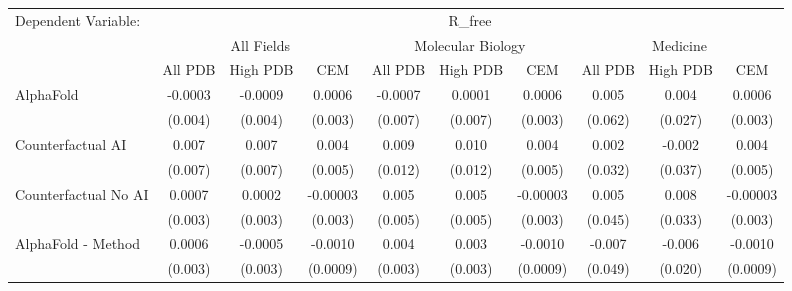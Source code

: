 \begingroup
\centering
\begin{tabular}{lccccccccc}
   \tabularnewline \midrule \midrule
   Dependent Variable: & \multicolumn{9}{c}{R\_free}\\
 & \multicolumn{3}{c}{All Fields} & \multicolumn{3}{c}{Molecular Biology} & \multicolumn{3}{c}{Medicine} \\
\cmidrule(lr){2-7} \cmidrule(lr){5-10} \cmidrule(lr){8-7}
 & \multicolumn{1}{c}{All PDB} & \multicolumn{1}{c}{High PDB} & \multicolumn{1}{c}{CEM} & \multicolumn{1}{c}{All PDB} & \multicolumn{1}{c}{High PDB} & \multicolumn{1}{c}{CEM} & \multicolumn{1}{c}{All PDB} & \multicolumn{1}{c}{High PDB} & \multicolumn{1}{c}{CEM} \\
\cmidrule(lr){2-3} \cmidrule(lr){3-4} \cmidrule(lr){4-5} \cmidrule(lr){5-6} \cmidrule(lr){6-7} \cmidrule(lr){7-8} \cmidrule(lr){8-9} \cmidrule(lr){9-10} \cmidrule(lr){10-3}
   AlphaFold                                                   & -0.0003        & -0.0009        & 0.0006        & -0.0007       & 0.0001        & 0.0006        & 0.005         & 0.004   & 0.0006\\   
                                                               & (0.004)        & (0.004)        & (0.003)       & (0.007)       & (0.007)       & (0.003)       & (0.062)       & (0.027) & (0.003)\\   
   Counterfactual AI                                           & 0.007          & 0.007          & 0.004         & 0.009         & 0.010         & 0.004         & 0.002         & -0.002  & 0.004\\   
                                                               & (0.007)        & (0.007)        & (0.005)       & (0.012)       & (0.012)       & (0.005)       & (0.032)       & (0.037) & (0.005)\\   
   Counterfactual No AI                                        & 0.0007         & 0.0002         & -0.00003      & 0.005         & 0.005         & -0.00003      & 0.005         & 0.008   & -0.00003\\   
                                                               & (0.003)        & (0.003)        & (0.003)       & (0.005)       & (0.005)       & (0.003)       & (0.045)       & (0.033) & (0.003)\\   
   AlphaFold - Method                                          & 0.0006         & -0.0005        & -0.0010       & 0.004         & 0.003         & -0.0010       & -0.007        & -0.006  & -0.0010\\   
                                                               & (0.003)        & (0.003)        & (0.0009)      & (0.003)       & (0.003)       & (0.0009)      & (0.049)       & (0.020) & (0.0009)\\   

\end{tabular}
